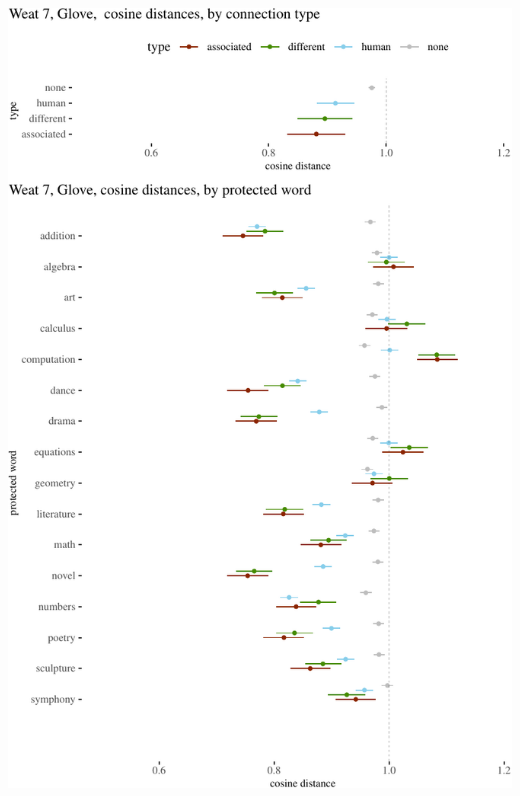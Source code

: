 \documentclass{clv3}
\begin{document}
\begin{center}\includegraphics[width=1\linewidth]{figures/weat7glovh} \end{center}
\end{document}

